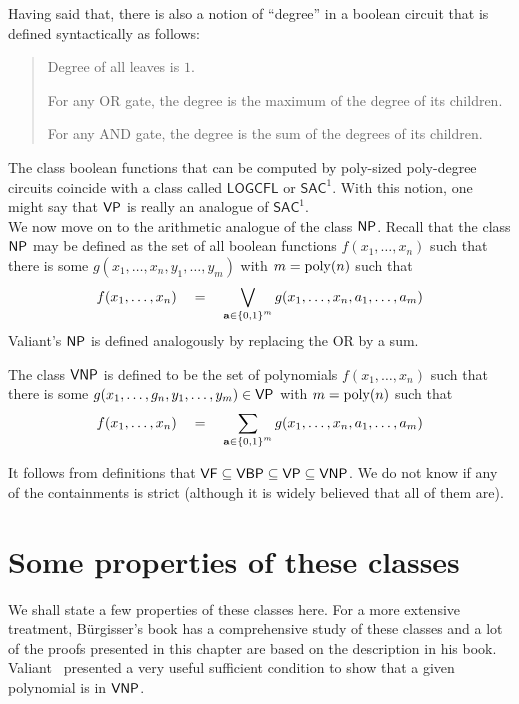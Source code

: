 Having said that, there is also a notion of ``degree'' in a boolean circuit that is defined syntactically as follows:
 \begin{quote}
   Degree of all leaves is $1$. 

   For any OR gate, the degree is the maximum of the degree of its children. 

   For any AND gate, the degree is the sum of the degrees of its children. 
 \end{quote}
The class boolean functions that can be computed by poly-sized poly-degree circuits coincide with a class called $\mathsf{LOGCFL}$ or $\mathsf{SAC}^1$. 
With this notion, one might say that $\mathsf{VP}$ is really an analogue of $\mathsf{SAC}^1$.\\


We now move on to the arithmetic analogue of the class $\NP$. 
Recall that the class $\NP$ may be defined as the set of all boolean functions $f(x_1,\dots, x_n)$ such that there is some $g(x_1,\dots, x_n, y_1,\dots, y_m)$ with $m = \operatorname{poly}(n)$ such that 
\[
f(x_1,\dots, x_n)\quad = \quad \bigvee_{\mathbf{a} \in \left\{0,1\right\}^m}  g(x_1,\dots, x_n, a_1,\dots, a_m)
\]
Valiant's $\NP$ is defined analogously by replacing the OR by a sum. 

\begin{definition}[Valiant's $\NP$]\label{defn:vnp}
The class $\mathsf{VNP}$ is defined to be the set of polynomials $f(x_1,\dots, x_n)$ such that there is some $g(x_1,\dots, g_n, y_1,\dots, y_m) \in \mathsf{VP}$ with $m = \operatorname{poly}(n)$ such that 
\[
f(x_1,\dots, x_n)\quad = \quad \sum_{\mathbf{a} \in \left\{0,1\right\}^m}  g(x_1,\dots, x_n, a_1,\dots, a_m)
\]
\end{definition}

It follows from definitions that $\mathsf{VF} \subseteq \mathsf{VBP} \subseteq \mathsf{VP} \subseteq \mathsf{VNP}$. 
We do not know if any of the containments is strict (although it is widely believed that all of them are). 

\section{Some properties of these classes}

We shall state a few properties of these classes here. 
For a more extensive treatment, B\"{u}rgisser's book \cite{bur00} has a comprehensive study of these classes and a lot of the proofs presented in this chapter are based on the description in his book. \\

Valiant~\cite{v79} presented a very useful sufficient condition to show that a given polynomial is in $\mathsf{VNP}$. 

